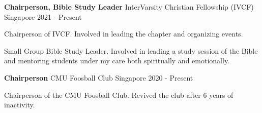 

\begin{cventries}
    \cventry
    {\textbf{Chairperson, Bible Study Leader}} %
    {InterVarsity Christian Fellowship (IVCF)} %
    {Singapore} %
    {2021 - Present} %
    { %
        \begin{cvitems}
            \item {Chairperson of IVCF. Involved in leading the chapter and organizing events.}
            \item {Small Group Bible Study Leader. Involved in leading a study session of the Bible and mentoring students under my care both spiritually and emotionally.}
        \end{cvitems}
    }
\end{cventries}

\begin{cventries}
	
	
	\cventry
	{\textbf{Chairperson}} %
	{CMU Foosball Club} %
	{Singapore} %
	{2020 - Present} %
	{ %
		\begin{cvitems}
			\item {Chairperson of the CMU Foosball Club. Revived the club after 6 years of inactivity.}
		\end{cvitems}
	}
\end{cventries}

